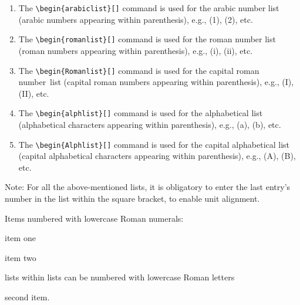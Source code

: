 \begin{enumerate}
\item The \verb|\begin{arabiclist}[]| command is used for the arabic
number list (arabic numbers appearing within parenthesis), e.g., (1),
(2), etc.

\smallskip

\item The \verb|\begin{romanlist}[]| command is used for the roman
number list (roman numbers appearing within parenthesis), e.g., (i),
(ii), etc.

\smallskip

\item The \verb|\begin{Romanlist}[]| command is used for the capital roman
\hbox{number list} (capital roman numbers appearing within parenthesis),
e.g., (I), (II), etc.

\smallskip

\item The \verb|\begin{alphlist}[]| command is used for the alphabetical
list (alphabetical characters appearing within parenthesis),
e.g., (a), (b), etc.

\smallskip

\item The \verb|\begin{Alphlist}[]| command is used for the capital
alphabetical list (capital alphabetical characters appearing within
parenthesis), e.g., (A), (B), etc.
\end{enumerate}

Note: For all the above-mentioned lists, it is obligatory to enter the last
entry's number in the list within the square bracket, to enable unit
alignment.

Items numbered with lowercase Roman numerals:

\begin{romanlist}[(ii)]
\item item one
\item item two
    \begin{alphlist}[(a)]
    \item lists within lists can be numbered with lowercase Roman letters
    \item second item.
    \end{alphlist}
\end{romanlist}

